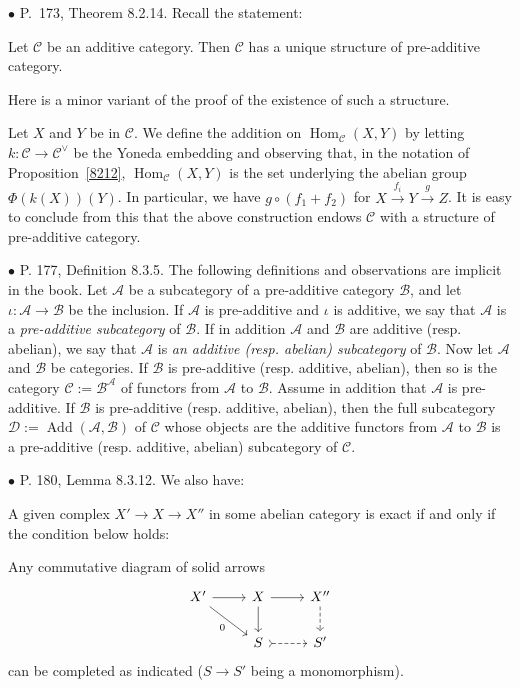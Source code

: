 \documentclass[12pt]{article}
\theoremstyle{remark}%
\newcommand{\bu}{\bullet}
\newcommand{\n}{\noindent}
\newcommand{\cc}{\mathcal}
\newcommand{\C}{\mathcal C}
\newcommand{\xr}{\xrightarrow}
\newcommand{\pr}{Proposition}
\DeclareMathOperator{\Ad}{Add}
\DeclareMathOperator{\h}{Hom}
\begin{document}
\n$\bu$ P.~173, Theorem 8.2.14. Recall the statement: 

Let $\C$ be an additive category. Then $\C$ has a unique structure of pre-additive category. 

Here is a minor variant of the proof of the existence of such a structure. 

Let $X$ and $Y$ be in $\C$. We define the addition on $\h_\C(X,Y)$ by letting $k:\C\to\C^\vee$ be the Yoneda embedding and observing that, in the notation of \pr\ \ref{8212}, $\h_\C(X,Y)$ is the set underlying the abelian group $\Phi(k(X))(Y)$. In particular, we have $g\circ(f_1+f_2)$ for $X\xr{f_i}Y\xr gZ$. It is easy to conclude from this that the above construction endows $\C$ with a structure of pre-additive category. 


\n$\bu$ P. 177, Definition 8.3.5. The following definitions and observations are implicit in the book. Let $\cc A$ be a subcategory of a pre-additive category $\cc B$, and let $\iota:\cc A\to \cc B$ be the inclusion. If $\cc A$ is pre-additive and $\iota$ is additive, we say that $\cc A$ is a {\em pre-additive subcategory} of $\cc B$. If in addition $\cc A$ and $\cc B$ are additive (resp. abelian), we say that $\cc A$ is {\em an additive (resp. abelian) subcategory} of $\cc B$. Now let $\cc A$ and $\cc B$ be categories. If $\cc B$ is pre-additive (resp. additive, abelian), then so is the category $\cc C:=\cc B^\cc A$ of functors from $\cc A$ to $\cc B$. Assume in addition that $\cc A$ is pre-additive. If $\cc B$ is pre-additive (resp. additive, abelian), then the full subcategory $\cc D:=\Ad(\cc A,\cc B)$ of $\cc C$ whose objects are the additive functors from $\cc A$ to $\cc B$ is a pre-additive (resp. additive, abelian) subcategory of $\cc C$. 


\n$\bu$ P. 180, Lemma 8.3.12. We also have:

A given complex $X'\to X\to X''$ in some abelian category is exact if and only if the condition below holds:

Any commutative diagram of solid arrows
$$
\begin{tikzcd}
X'\ar{dr}[swap]{0}\ar{r}&X\ar{d}\ar{r}&X''\ar[dashed]{d}\\ 
{}&S\ar[tail,dashed]{r}&S'
\end{tikzcd}
$$ 
can be completed as indicated ($S\to S'$ being a monomorphism).

\end{document}
